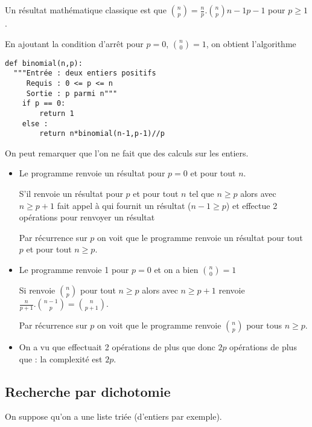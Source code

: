 Un résultat mathématique classique est que $\displaystyle \binom n p=\frac np.\binom n p{n-1}{p-1}$ pour $p\ge 1$.

En ajoutant la condition d'arrêt pour $p=0$, $\binom n 0= 1$, on obtient l'algorithme
\begin{lstlisting}
def binomial(n,p):
  """Entrée : deux entiers positifs
     Requis : 0 <= p <= n
     Sortie : p parmi n"""
    if p == 0:
        return 1
    else :
        return n*binomial(n-1,p-1)//p
\end{lstlisting}
On peut remarquer que l'on ne fait que des calculs sur les entiers.
\begin{itemize}
  \item Le programme renvoie un résultat pour $p=0$ et pour tout $n$.
  
  S'il renvoie un résultat pour $p$ et pour tout $n$ tel que $n\ge p$ alors  avec $n\ge p+1$ fait appel à  qui fournit un résultat ($n-1 \ge p$) et effectue 2 opérations pour renvoyer un résultat
  
  Par récurrence sur $p$ on voit que le programme renvoie un résultat pour tout $p$ et pour tout $n\ge p$.
  \item Le programme renvoie 1 pour $p=0$ et on a bien $\binom n0=1$
  
  Si  renvoie $\binom np$ pour tout $n\ge p$ alors   avec $n\ge p+1$ renvoie $\frac n{p+1}.\binom{n-1}p = \binom n{p+1}$.
  
  Par récurrence sur $p$ on voit que le programme renvoie $\binom np$ pour tous $n\ge p$.
  \item On a vu que  effectuait 2 opérations de plus que   donc $2p$ opérations de plus que   : la complexité est $2p$.
  
  \end{itemize}
\subsection{Recherche par dichotomie}
On suppose qu'on a une liste triée (d'entiers par exemple).

